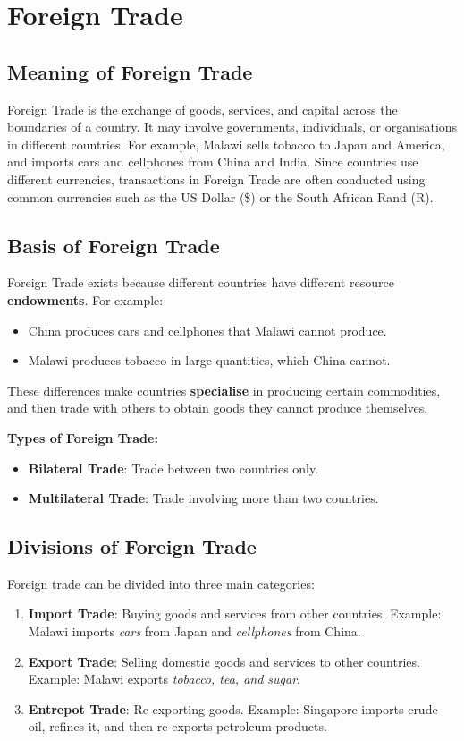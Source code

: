 \documentclass[12pt,a4paper, openany]{book}
\begin{document}
\section{Foreign Trade}

\subsection{Meaning of Foreign Trade}
Foreign Trade is the exchange of goods, services, and capital across the boundaries of a country.
It may involve governments, individuals, or organisations in different countries.
For example, Malawi sells tobacco to Japan and America, and imports cars and cellphones from China and India.
Since countries use different currencies, transactions in Foreign Trade are often conducted using common currencies such as the US Dollar (\$) or the South African Rand (R).

\subsection{Basis of Foreign Trade}
Foreign Trade exists because different countries have different resource \textbf{endowments}.
For example:
\begin{itemize}
	\item China produces cars and cellphones that Malawi cannot produce.
	\item Malawi produces tobacco in large quantities, which China cannot.
\end{itemize}

These differences make countries \textbf{specialise} in producing certain commodities, and then trade with others to obtain goods they cannot produce themselves.

\textbf{Types of Foreign Trade:}
\begin{itemize}
	\item \textbf{Bilateral Trade}: Trade between two countries only.
	\item \textbf{Multilateral Trade}: Trade involving more than two countries.
\end{itemize}

\subsection{Divisions of Foreign Trade}
Foreign trade can be divided into three main categories:

\begin{enumerate}
	\item \textbf{Import Trade}: Buying goods and services from other countries.
	      Example: Malawi imports \textit{cars} from Japan and \textit{cellphones} from China.

	\item \textbf{Export Trade}: Selling domestic goods and services to other countries.
	      Example: Malawi exports \textit{tobacco, tea, and sugar}.

	\item \textbf{Entrepot Trade}: Re-exporting goods.
	      Example: Singapore imports crude oil, refines it, and then re-exports petroleum products.
\end{enumerate}
\end{document}
